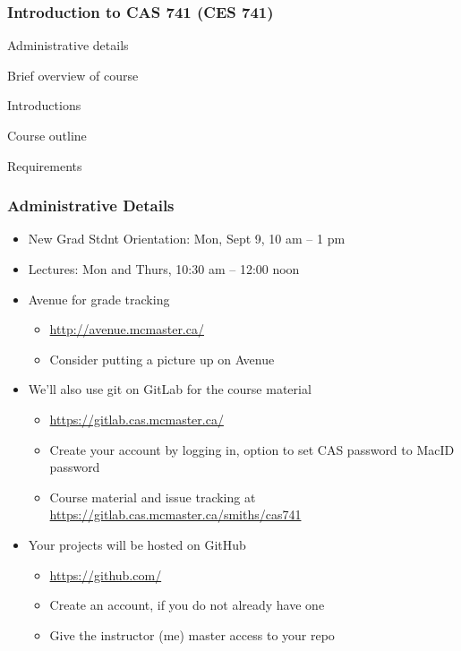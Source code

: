 \documentclass[t,12pt,numbers,fleqn]{beamer}
\begin{document}




\begin{frame}
\frametitle{Introduction to CAS 741 (CES 741)}

\bi
\item Administrative details
\item Brief overview of course
\item Introductions
\item Course outline
\item Requirements
\ei
\end{frame}


\begin{frame}
\frametitle{Administrative Details}

\begin{itemize}

\item New Grad Stdnt Orientation: Mon, Sept 9, 10 am -- 1 pm %
\item Lectures: Mon and Thurs, 10:30 am -- 12:00 noon
\item Avenue for grade tracking
\begin{itemize}
\item \url{http://avenue.mcmaster.ca/} 
\item Consider putting a picture up on Avenue
\end{itemize}
\item We'll also use git on GitLab for the course material
\begin{itemize}
\item \url{https://gitlab.cas.mcmaster.ca/}
\item Create your account by logging in, option to set CAS password to MacID password
\item Course material and issue tracking at \url{https://gitlab.cas.mcmaster.ca/smiths/cas741}
\end{itemize}
\item Your projects will be hosted on GitHub
\begin{itemize}
\item \url{https://github.com/}
\item Create an account, if you do not already have one
\item Give the instructor (me) master access to your repo
\end{itemize}

\end{itemize}

\end{frame}
\end{document}

